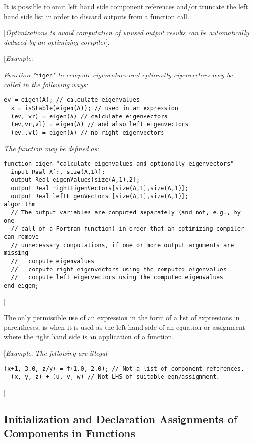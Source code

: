 It is possible to omit left hand side component references and/or
truncate the left hand side list in order to discard outputs from a
function call.

{[}\emph{Optimizations to avoid computation of unused output results can
be automatically deduced by an optimizing compiler}{]}.

{[}\emph{Example}:

\emph{Function "}\lstinline!eigen!\emph{" to compute eigenvalues and optionally
eigenvectors may be called in the following ways:}

\begin{lstlisting}[language=modelica]
  ev = eigen(A); // calculate eigenvalues
  x = isStable(eigen(A)); // used in an expression
  (ev, vr) = eigen(A) // calculate eigenvectors
  (ev,vr,vl) = eigen(A) // and also left eigenvectors
  (ev,,vl) = eigen(A) // no right eigenvectors
\end{lstlisting}
\emph{The function may be defined as:}

\begin{lstlisting}[language=modelica]
function eigen "calculate eigenvalues and optionally eigenvectors"
  input Real A[:, size(A,1)];
  output Real eigenValues[size(A,1),2];
  output Real rightEigenVectors[size(A,1),size(A,1)];
  output Real leftEigenVectors [size(A,1),size(A,1)];
algorithm
  // The output variables are computed separately (and not, e.g., by one
  // call of a Fortran function) in order that an optimizing compiler can remove
  // unnecessary computations, if one or more output arguments are missing
  //   compute eigenvalues
  //   compute right eigenvectors using the computed eigenvalues
  //   compute left eigenvectors using the computed eigenvalues
end eigen;
\end{lstlisting}
{]}

The only permissible use of an expression in the form of a list of
expressions in parentheses, is when it is used as the left hand side of
an equation or assignment where the right hand side is an application of
a function.

{[}\emph{Example}. \emph{The following are illegal}:

\begin{lstlisting}[language=modelica]
  (x+1, 3.0, z/y) = f(1.0, 2.0); // Not a list of component references.
  (x, y, z) + (u, v, w) // Not LHS of suitable eqn/assignment.
\end{lstlisting}
{]}

\subsection{Initialization and Declaration Assignments of Components in Functions}

